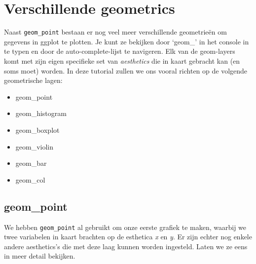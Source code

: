 \documentclass[]{tufte-book}
\providecommand{\tightlist}{%
  \setlength{\itemsep}{0pt}\setlength{\parskip}{0pt}}
\begin{document}
\hypertarget{verschillende-geometrics}{%
\section{Verschillende geometrics}\label{verschillende-geometrics}}

Naast \texttt{geom\_point} bestaan er nog veel meer verschillende geometrieën om gegevens in ggplot te plotten. Je kunt ze bekijken door `geom\_' in het console in te typen en door de auto-complete-lijst te navigeren. Elk van de geom-layers komt met zijn eigen specifieke set van \emph{aesthetics} die in kaart gebracht kan (en soms moet) worden. In deze tutorial zullen we ons vooral richten op de volgende geometrische lagen:

\begin{itemize}
\tightlist
\item
  geom\_point
\item
  geom\_histogram
\item
  geom\_boxplot
\item
  geom\_violin
\item
  geom\_bar
\item
  geom\_col
\end{itemize}

\hypertarget{geom_point}{%
\subsection{geom\_point}\label{geom_point}}

We hebben \texttt{geom\_point} al gebruikt om onze eerste grafiek te maken, waarbij we twee variabelen in kaart brachten op de esthetica \emph{x} en \emph{y}. Er zijn echter nog enkele andere aesthetics's die met deze laag kunnen worden ingesteld. Laten we ze eens in meer detail bekijken.
\end{document}
